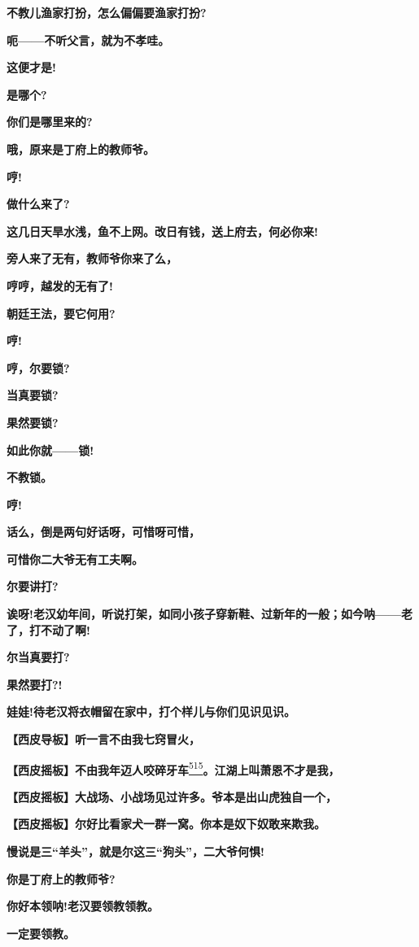 \textbf{不教儿渔家打扮，怎么偏偏要渔家打扮?}

\textbf{呃------不听父言，就为不孝哇。}

\textbf{这便才是!}

\textbf{是哪个?}

\textbf{你们是哪里来的?}

\textbf{哦，原来是丁府上的教师爷。}

\textbf{哼!}

\textbf{做什么来了?}

\textbf{这几日天旱水浅，鱼不上网。改日有钱，送上府去，何必你来!}

\textbf{旁人来了无有，教师爷你来了么，}

\textbf{哼哼，越发的无有了!}

\textbf{朝廷王法，要它何用?}

\textbf{哼!}

\textbf{哼，尔要锁?}

\textbf{当真要锁?}

\textbf{果然要锁?}

\textbf{如此你就------锁!}

\textbf{不教锁。}

\textbf{哼!}

\textbf{话么，倒是两句好话呀，可惜呀可惜，}

\textbf{可惜你二大爷无有工夫啊。}

\textbf{尔要讲打?}

\textbf{诶呀!老汉幼年间，听说打架，如同小孩子穿新鞋、过新年的一般；如今呐------老了，打不动了啊!}

\textbf{尔当真要打?}

\textbf{果然要打?!}

\textbf{娃娃!待老汉将衣帽留在家中，打个样儿与你们见识见识。}

\textbf{【西皮导板】听一言不由我七窍冒火，}

\textbf{【西皮摇板】不由我年迈人咬碎牙车}\protect\hyperlink{fn515}{\textsuperscript{515}}\textbf{。江湖上叫萧恩不才是我，}

\textbf{【西皮摇板】大战场、小战场见过许多。爷本是出山虎独自一个，}

\textbf{【西皮摇板】尔好比看家犬一群一窝。你本是奴下奴敢来欺我。}

\textbf{慢说是三``羊头''，就是尔这三``狗头''，二大爷何惧!}

\textbf{你是丁府上的教师爷?}

\textbf{你好本领呐!老汉要领教领教。}

\textbf{一定要领教。}

